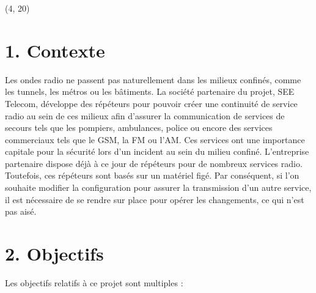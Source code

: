 \documentclass{beamer}
\begin{document}
\setlength{\TPHorizModule}{1cm}
\setlength{\TPVertModule}{1cm}


\maketitle

\begin{textblock}{36}(4, 20)
	\begin{minipage}{0.99\textwidth}
	\section{1. Contexte}
		Les ondes radio ne passent pas naturellement dans les milieux confinés, comme les tunnels, les métros ou les bâtiments. La société partenaire du projet, SEE Telecom, développe des répéteurs pour pouvoir créer une continuité de service radio au sein de ces milieux afin d'assurer la communication de services de secours tels que les pompiers, ambulances, police ou encore des services commerciaux tels que le GSM, la FM ou l'AM. Ces services ont une importance capitale pour la sécurité lors d'un incident au sein du milieu confiné.
		L'entreprise partenaire dispose déjà à ce jour de répéteurs pour de nombreux services radio. Toutefois, ces répéteurs sont basés sur un matériel figé. Par conséquent, si l'on souhaite modifier la configuration pour assurer la transmission d'un autre service, il est nécessaire de se rendre sur place pour opérer les changements, ce qui n'est pas aisé.
		
		
	\section{2. Objectifs}
		Les objectifs relatifs à ce projet sont multiples :
	\end{minipage}
\end{textblock}
\end{document}
